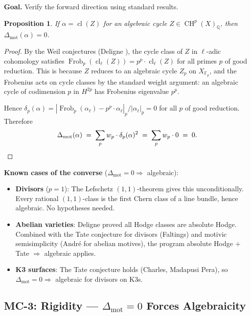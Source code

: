 \documentclass[11pt]{article}
\newtheorem{proposition}[theorem]{Proposition}
\theoremstyle{definition}
\DeclareMathOperator{\cl}{cl}
\DeclareMathOperator{\Frob}{Frob}
\DeclareMathOperator{\CH}{CH}
\begin{document}
\textbf{Goal.}  Verify the forward direction using standard results.

\begin{proposition}
\label{prop:mc2}
If $\alpha = \cl(Z)$ for an algebraic cycle $Z \in \CH^p(X)_{\mathbb{Q}}$,
then $\Delta_{\mathrm{mot}}(\alpha) = 0$.
\end{proposition}

\begin{proof}
By the Weil conjectures (Deligne \cite{Deligne-Weil}), the cycle class
of $Z$ in $\ell$-adic cohomology satisfies
$\Frob_p(\cl_\ell(Z)) = p^p \cdot \cl_\ell(Z)$ for all primes $p$ of good
reduction.  This is because $Z$ reduces to an algebraic cycle
$Z_p$ on $X_{\mathbb{F}_p}$, and the Frobenius acts on cycle classes by
the standard weight argument: an algebraic cycle of codimension $p$
in $H^{2p}$ has Frobenius eigenvalue $p^p$.

Hence $\delta_p(\alpha) = |\Frob_p(\alpha_\ell) - p^p \cdot \alpha_\ell|_p
/ |\alpha_\ell|_p = 0$ for all $p$ of good reduction.  Therefore
\[
  \Delta_{\mathrm{mot}}(\alpha) \;=\; \sum_{p} w_p \cdot \delta_p(\alpha)^2
  \;=\; \sum_{p} w_p \cdot 0 \;=\; 0. \qedhere
\]
\end{proof}

\noindent\textbf{Known cases of the converse}
($\Delta_{\mathrm{mot}} = 0 \Rightarrow$ algebraic):

\begin{itemize}
  \item \textbf{Divisors} ($p = 1$): The Lefschetz $(1,1)$-theorem gives
    this unconditionally.  Every rational $(1,1)$-class is the first Chern
    class of a line bundle, hence algebraic.  No hypotheses needed.
  \item \textbf{Abelian varieties}: Deligne proved all Hodge classes are
    absolute Hodge.  Combined with the Tate conjecture for divisors
    (Faltings) and motivic semisimplicity (Andr\'e for abelian motives),
    the program absolute Hodge $+$ Tate $\Rightarrow$ algebraic applies.
  \item \textbf{K3 surfaces}: The Tate conjecture holds (Charles, Madapusi
    Pera), so $\Delta_{\mathrm{mot}} = 0 \Rightarrow$ algebraic for
    divisors on K3s.
\end{itemize}

\subsection{MC-3: Rigidity --- $\Delta_{\mathrm{mot}} = 0$ Forces Algebraicity}
\label{sec:mc3}
\end{document}

